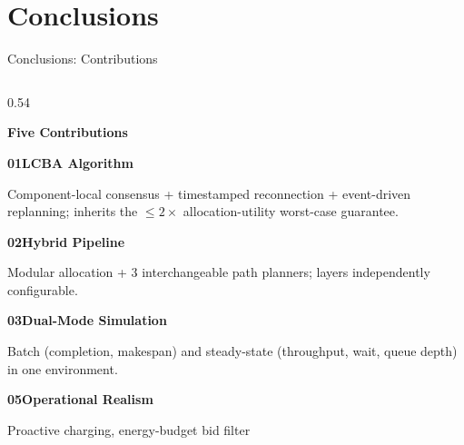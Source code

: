 \documentclass[aspectratio=169, 11pt]{beamer}
\newcommand{\subheader}[1]{{\rmfamily\bfseries\normalsize\color{TextPrimary} #1}}
\newcommand{\smallcap}[1]{{\rmfamily\small\color{TextSecondary} #1}}
\begin{document}
\section{Conclusions}

\begin{frame}{Conclusions: Contributions}
  \begin{columns}[T]
    \begin{column}{0.54\textwidth}
      {\rmfamily\footnotesize
      \subheader{Five Contributions}\par\vspace{4pt}

        \vspace{8pt}
      \subheader{\textcolor{TextMuted}{01}\hspace{6pt}LCBA Algorithm}\par\vspace{1pt}
      \smallcap{Component-local consensus + timestamped reconnection + event-driven replanning; inherits the $\leq 2\times$ allocation-utility worst-case guarantee.}

      \vspace{8pt}
      \subheader{\textcolor{TextMuted}{02}\hspace{6pt}Hybrid Pipeline}\par\vspace{1pt}
      \smallcap{Modular allocation + 3 interchangeable path planners; layers independently configurable.}

      \vspace{8pt}
      \subheader{\textcolor{TextMuted}{03}\hspace{6pt}Dual-Mode Simulation}\par\vspace{1pt}
      \smallcap{Batch (completion, makespan) and steady-state (throughput, wait, queue depth) in one environment.}


      \vspace{8pt}
      \subheader{\textcolor{TextMuted}{05}\hspace{6pt}Operational Realism}\par\vspace{1pt}
      \smallcap{Proactive charging, energy-budget bid filter}
      }


\end{column}
\end{columns}
\end{frame}
\end{document}
